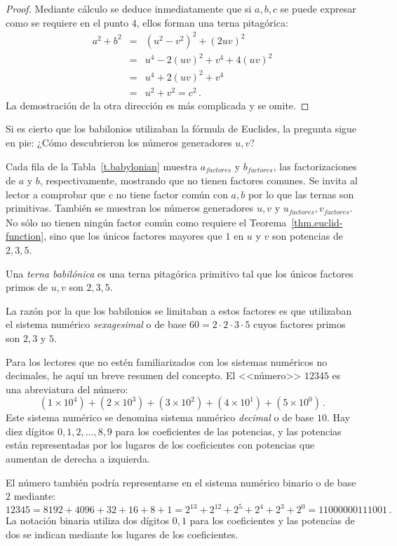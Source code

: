 \begin{proof}
Mediante cálculo se deduce inmediatamente que si $ {a,b,c}$ se puede expresar como se requiere en el punto $4$, ellos forman una terna pitagórica:
\begin{eqnarray*}
a^2+b^2&=&(u^2-v^2)^2 + (2uv)^2\\
&=& u^4-2(uv)^2+v^4+4(uv)^2\\
&=&u^4+2(uv)^2+v^4\\
&=&u^2+v^2=c^2\,.
\end{eqnarray*}
La demostración de la otra dirección es más complicada y se omite.
\end{proof}
Si es cierto que los babilonios utilizaban la fórmula de Euclides, la pregunta sigue en pie: ¿Cómo descubrieron los números generadores $u,v$?

Cada fila de la Tabla~\ref{t.babylonian} muestra $a_{\textit{factores}}$ y $b_{\textit{factores}}$, las factorizaciones de $a$ y $b$, respectivamente, mostrando que no tienen factores comunes. Se invita al lector a comprobar que $c$ no tiene factor común con $a,b$ por lo que las ternas son primitivas. También se muestran los números generadores $u,v$ y $u_{\textit{factores}}, v_{\textit{factores}}$. No sólo no tienen ningún factor común como requiere el Teorema~\ref{thm.euclid-function}, sino que los únicos factores mayores que $1$ en $u$ y $v$ son potencias de $2,3,5$.
\begin{definition}
Una \emph{terna babilónica} es una terna pitagórica primitivo tal que los únicos factores primos de $u,v$ son $2,3,5$.
\end{definition}
La razón por la que los babilonios se limitaban a estos factores es que utilizaban el sistema numérico \emph{sexagesimal} o de base $60=2\cdot 2\cdot 3\cdot 5$ cuyos factores primos son $2,3$ y $5$.

Para los lectores que no estén familiarizados con los sistemas numéricos no decimales, he aquí un breve resumen del concepto. El <<número>> $12345$ es una abreviatura del número:
\[
(1\times 10^4) + (2\times 10^3) + (3\times 10^2) + (4\times 10^1) + (5\times 10^0)\,.
\]
Este sistema numérico se denomina sistema numérico \emph{decimal} o de base $10$. Hay diez dígitos $0,1,2,\ldots,8,9$ para los coeficientes de las potencias, y las potencias están representadas por los lugares de los coeficientes con potencias que aumentan de derecha a izquierda. 

El número también podría representarse en el sistema numérico binario o de base $2$ mediante:
\[
12345=8192 + 4096 + 32+16+8+1=
2^{13} + 2^{12} + 2^{5} + 2^{4} + 2^{3} + 2^0=11000000111001\,.
\]
La notación binaria utiliza dos dígitos $0,1$ para los coeficientes y las potencias de dos se indican mediante los lugares de los coeficientes.

